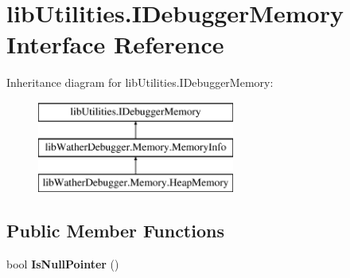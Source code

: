 \hypertarget{interfacelib_utilities_1_1_i_debugger_memory}{\section{lib\+Utilities.\+I\+Debugger\+Memory Interface Reference}
\label{interfacelib_utilities_1_1_i_debugger_memory}
}
Inheritance diagram for lib\+Utilities.\+I\+Debugger\+Memory\+:\begin{figure}[H]
\begin{center}
\leavevmode
\includegraphics[height=3.000000cm]{interfacelib_utilities_1_1_i_debugger_memory}
\end{center}
\end{figure}
\subsection*{Public Member Functions}
\begin{DoxyCompactItemize}
\item 
\hypertarget{interfacelib_utilities_1_1_i_debugger_memory_ac3c4d355b1c1caab31b42c570768da97}{bool {\bfseries Is\+Null\+Pointer} ()}\label{interfacelib_utilities_1_1_i_debugger_memory_ac3c4d355b1c1caab31b42c570768da97}

\end{DoxyCompactItemize}
